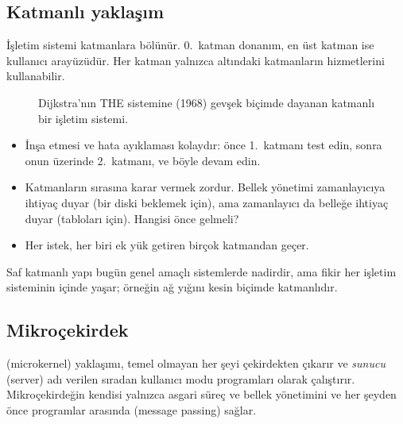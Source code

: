 \subsection{Katmanlı yaklaşım}

İşletim sistemi katmanlara bölünür. $0$.\ katman donanım, en üst katman ise kullanıcı arayüzüdür. Her katman yalnızca altındaki katmanların hizmetlerini kullanabilir.

\begin{figure}[H]
\centering
{}
\caption{Dijkstra'nın THE sistemine (1968) gevşek biçimde dayanan katmanlı bir işletim sistemi.}
\end{figure}

\begin{itemize}
  \item[\textcolor{mintdeep}{$+$}] İnşa etmesi ve hata ayıklaması kolaydır: önce 1.\ katmanı test edin, sonra onun üzerinde 2.\ katmanı, ve böyle devam edin.
  \item[\textcolor{red!60!black}{$-$}] Katmanların sırasına karar vermek zordur. Bellek yönetimi zamanlayıcıya ihtiyaç duyar (bir diski beklemek için), ama zamanlayıcı da belleğe ihtiyaç duyar (tabloları için). Hangisi önce gelmeli?
  \item[\textcolor{red!60!black}{$-$}] Her istek, her biri ek yük getiren birçok katmandan geçer.
\end{itemize}

Saf katmanlı yapı bugün genel amaçlı sistemlerde nadirdir, ama fikir her işletim sisteminin içinde yaşar; örneğin ağ yığını kesin biçimde katmanlıdır.

\subsection{Mikroçekirdek}
\label{sec:micro}

 (microkernel) yaklaşımı, temel olmayan her şeyi çekirdekten çıkarır ve \emph{sunucu} (server) adı verilen sıradan kullanıcı modu programları olarak çalıştırır. Mikroçekirdeğin kendisi yalnızca asgari süreç ve bellek yönetimini ve her şeyden önce programlar arasında  (message passing) sağlar.

